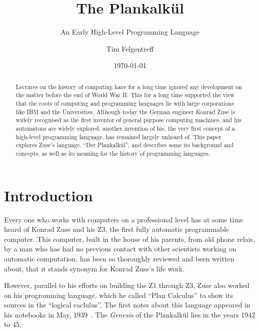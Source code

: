 \documentclass{llncs}
\begin{document}
\pagestyle{headings}  %
\mainmatter %
\title{The Plankalkül}
\subtitle{An Early High-Level Programming Language}
\author{Tim Felgentreff}
\date{\today}

\maketitle
\begin{abstract}
   Lectures on the history of computing have for a long time 
   ignored any development on the matter before the end of World War II. 
   This for a long time supported the view that the roots of 
   computing and programming languages lie with large corporations 
   like IBM and the Universities.
   Although today
   the German engineer Konrad Zuse is widely recognised
   as the first inventor of general purpose computing machines, 
   and his automatons are widely explored, another invention of 
   his, the very first concept of a 
   high-level programming language, has remained largely unheard of.
   This paper explores Zuse's language, ``Der Plankalkül'', 
   and describes some its background and concepts, as well as its 
   meaning for the history of programming languages.
\end{abstract}
 \section{Introduction}
   Every one who works with computers on a professional level has 
   at some time heard of Konrad Zuse and his Z3, the first fully 
   automatic programmable computer. This computer, built in the 
   house of his parents, from old phone relais, by a man who has had no 
   previous contact with other scientists working on automatic computation, 
   has been so thoroughly reviewed and been written about, that it 
   stands synonym for Konrad Zuse's life work.

   However, parallel to his efforts on building the Z1 through Z3, Zuse
   also worked on his programming language, which he called ``Plan Calculus''
   to show its sources in the ``logical caclulus''. The first notes about
   this language appeared in his notebooks in May, 1939~\cite{rojas2002konrad}. The \emph{Genesis}
   of the Plankalkül lies in the years 1942 to 45.
\end{document}

